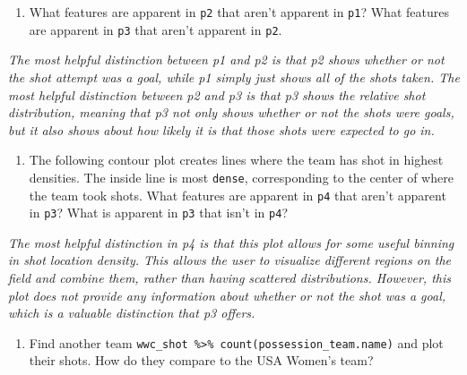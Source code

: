 \documentclass[]{article}
\newenvironment{Shaded}{\begin{snugshade}}{\end{snugshade}}
\newcommand{\KeywordTok}[1]{\textcolor[rgb]{0.13,0.29,0.53}{\textbf{#1}}}
\newcommand{\NormalTok}[1]{#1}
\newcommand{\OperatorTok}[1]{\textcolor[rgb]{0.81,0.36,0.00}{\textbf{#1}}}
\newcommand{\StringTok}[1]{\textcolor[rgb]{0.31,0.60,0.02}{#1}}
\providecommand{\tightlist}{%
  \setlength{\itemsep}{0pt}\setlength{\parskip}{0pt}}
\begin{document}
\begin{enumerate}
\def\labelenumi{\arabic{enumi}.}
\tightlist
\item
  What features are apparent in \texttt{p2} that aren't apparent in
  \texttt{p1}? What features are apparent in \texttt{p3} that aren't
  apparent in \texttt{p2}.
\end{enumerate}

\emph{The most helpful distinction between p1 and p2 is that p2 shows
whether or not the shot attempt was a goal, while p1 simply just shows
all of the shots taken. The most helpful distinction between p2 and p3
is that p3 shows the relative shot distribution, meaning that p3 not
only shows whether or not the shots were goals, but it also shows about
how likely it is that those shots were expected to go in.}

\begin{enumerate}
\def\labelenumi{\arabic{enumi}.}
\setcounter{enumi}{1}
\tightlist
\item
  The following contour plot creates lines where the team has shot in
  highest densities. The inside line is most \texttt{dense},
  corresponding to the center of where the team took shots. What
  features are apparent in \texttt{p4} that aren't apparent in
  \texttt{p3}? What is apparent in \texttt{p3} that isn't in
  \texttt{p4}?
\end{enumerate}

\begin{Shaded}
\end{Shaded}

\emph{The most helpful distinction in p4 is that this plot allows for
some useful binning in shot location density. This allows the user to
visualize different regions on the field and combine them, rather than
having scattered distributions. However, this plot does not provide any
information about whether or not the shot was a goal, which is a
valuable distinction that p3 offers.}

\begin{enumerate}
\def\labelenumi{\arabic{enumi}.}
\setcounter{enumi}{2}
\tightlist
\item
  Find another team
  \texttt{wwc\_shot\ \%\textgreater{}\%\ count(possession\_team.name)}
  and plot their shots. How do they compare to the USA Women's team?
\end{enumerate}
\end{document}
